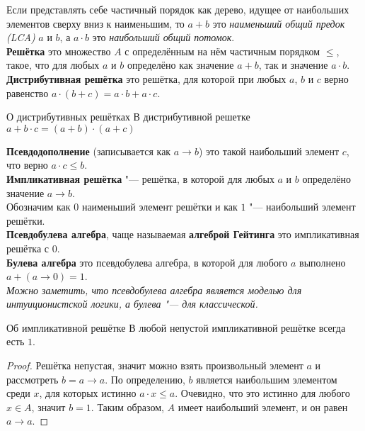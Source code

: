 Если представлять себе частичный порядок как дерево, идущее от наибольших элементов сверху вниз к наименьшим, то $a + b$ это \textit{наименьший общий предок (LCA)} $a$ и $b$, а $a \cdot b$ это \textit{наибольший общий потомок}.\\

\noindent\textbf{Решётка} это множество $A$ с определённым на нём частичным порядком $\leq$, такое, что для любых $a$ и $b$ определёно как значение $a+b$, так и значение $a \cdot b$.\\

\noindent\textbf{Дистрибутивная решётка} это решётка, для которой при любых $a$, $b$ и $c$ верно равенство $a \cdot (b + c) = a \cdot b + a \cdot c$.

\begin{lemma}{О дистрибутивных решётках}
В дистрибутивной решетке $a + b \cdot c = (a + b) \cdot (a + c)$
\end{lemma}

\noindent\textbf{Псевдодополнение} (записывается как $a\to b$) это такой наибольший элемент $c$, что верно $a \cdot c \leq b$.\\

\noindent\textbf{Импликативная решётка} "--- решётка, в которой для любых $a$ и $b$ определёно значение $a \to b$.\\

\noindent Обозначим как $0$ наименьший элемент решётки и как $1$ "--- наибольший элемент решётки.\\

\noindent\textbf{Псевдобулева алгебра}, чаще называемая \textbf{алгеброй Гейтинга} это импликативная решётка с $0$.\\

\noindent\textbf{Булева алгебра} это псевдобулева алгебра, в которой для любого $a$ выполнено $a + (a \to 0) = 1$.\\

\noindent\textit{Можно заметить, что псевдобулева алгебра является моделью для интуиционистской логики, а булева "--- для классической.}

\begin{lemma}{Об импликативной решётке}
В любой непустой импликативной решётке всегда есть $1$.
\end{lemma}

\begin{proof}
Решётка непустая, значит можно взять произвольный элемент $a$ и рассмотреть $b = a \to a$. По определению, $b$ является наибольшим элементом среди $x$, для которых истинно $a \cdot x \leq a$. Очевидно, что это истинно для любого $x \in A$, значит $b = 1$. Таким образом, $A$ имеет наибольший элемент, и он равен $a\to a$.
\end{proof}

